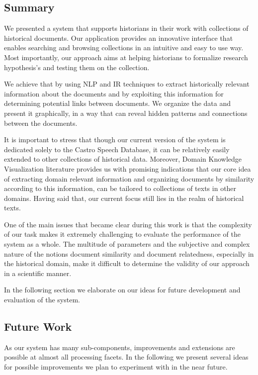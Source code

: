 \subsection {Summary}
\label{sec:summary}

We presented a system that supports historians in their work with collections of historical documents. 
Our application provides an innovative interface that enables searching and browsing collections in an intuitive and easy to use way.
Most importantly, our approach aims at helping historians to formalize research hypothesis's and testing them on the collection.

We achieve that by using NLP and IR techniques to extract historically relevant information about the documents and by exploiting
this information for determining potential links between documents. We organize the data and present it graphically,
in a way that can reveal hidden patterns and connections between the documents.
 
It is important to stress that though our current version of the system is dedicated solely to the Castro Speech Database, 
it can be relatively easily extended to other collections of historical data. Moreover, Domain Knowledge Visualization literature
provides us with promising indications that our core idea of extracting domain relevant information and organizing documents by similarity 
according to this information, can be tailored to collections of texts in other domains. Having said that, our current focus still lies in the realm of historical texts. 

One of the main issues that became clear during this work is that the complexity of our task makes it extremely challenging to evaluate the performance of the system as a whole. The multitude of parameters and the subjective and complex nature of the notions document similarity and document relatedness, especially in the historical domain, make it difficult to determine the validity of our approach in a scientific manner. 

In the following section we elaborate on our ideas for future development and evaluation of the system. 
 

\subsection {Future Work}
\label{sec:future_work}
As our system has many sub-components, improvements and extensions are possible
at almost all processing facets. In the following we present several ideas for possible improvements we plan to experiment with in the
near future.

